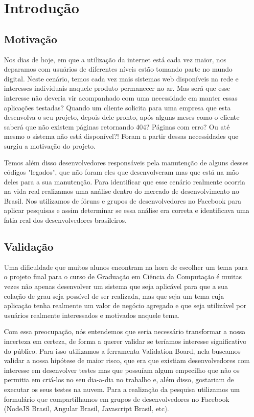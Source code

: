 \chapter{Introdução}\label{chp:LABEL_CHP_1}

\section{Motivação}\label{sec:LABEL_CHP_1_SEC_A}

Nos dias de hoje, em que a utilização da internet está cada vez maior, nos deparamos com usuários de diferentes níveis estão tomando parte no mundo digital. Neste cenário, temos cada vez mais sistemas web disponíveis na rede e interesses individuais naquele produto permanecer no ar. Mas será que esse interesse não deveria vir acompanhado com uma necessidade em manter essas aplicações testadas? Quando um cliente solicita para uma empresa que esta desenvolva o seu projeto, depois dele pronto, após alguns meses como o cliente saberá que não existem páginas retornando 404? Páginas com erro? Ou até mesmo o sistema não está disponível?! Foram a partir dessas necessidades que surgiu a motivação do projeto. 

Temos além disso desenvolvedores responsáveis pela manutenção de alguns desses códigos "legados", que não foram eles que desenvolveram mas que está na mão deles para a sua manutenção. Para identificar que esse cenário realmente ocorria na vida real realizamos uma análise dentro do mercado de desenvolvimento no Brasil. Nos utilizamos de fóruns e grupos de desenvolvedores no Facebook para aplicar pesquisas e assim determinar se essa análise era correta e identificava uma fatia real dos desenvolvedores brasileiros.

\section{Validação}\label{sec:LABEL_CHP_1_SEC_F}
Uma dificuldade que muitos alunos encontram na hora de escolher um tema para o projeto final para o curso de Graduação em Ciência da Computação é muitas vezes não apenas desenvolver um sistema que seja aplicável para que a sua colação de grau seja possível de ser realizada, mas que seja um tema cuja aplicação tenha realmente um valor de negócio agregado e que seja utilizável por usuários realmente interessados e motivados naquele tema.

Com essa preocupação, nós entendemos que seria necessário transformar a nossa incerteza em certeza, de forma a querer validar se teríamos interesse significativo do público. Para isso utilizamos a ferramenta Validation Board, nela buscamos validar a nossa hipótese de maior risco, que era que existiam desenvolvedores com interesse em desenvolver testes mas que possuíam algum empecilho que não os permitia em criá-los no seu dia-a-dia no trabalho e, além disso, gostariam de executar os seus testes na nuvem. Para a realização da pesquisa utilizamos um formulário que compartilhamos em grupos de desenvolvedores no Facebook (NodeJS Brasil, Angular Brasil, Javascript Brasil, etc).

